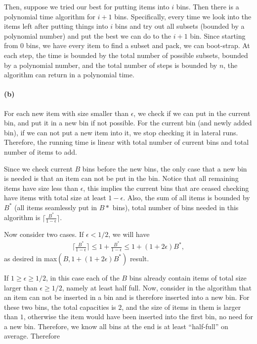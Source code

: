 \documentclass[12pt]{article}
\begin{document}
Then, suppose we tried our best for putting items into $i$ bins. Then there is a polynomial time algorithm for $i+1$ bins. Specifically, every time we look into the items left after putting things into $i$ bins and try out all subsets (bounded by a polynomial number) and put the best we can do to the $i+1$ bin. Since starting from $0$ bins, we have every item to find a subset and pack, we can boot-strap. At each step, the time is bounded by the total number of possible subsets, bounded by a polynomial number, and the total number of steps is bounded by $n$, the algorithm can return in a polynomial time.

\paragraph{(b)} For each new item with size smaller than $\epsilon$, we check if we can put in the current bin, and put it in a new bin if not possible. For the current bin (and newly added bin), if we can not put a new item into it, we stop checking it in lateral runs. Therefore, the running time is linear with total number of current bins and total number of items to add. 

Since we check current $B$ bins before the new bins, the only case that a new bin is needed is that an item can not be put in the bin. Notice that all remaining items have size less than $\epsilon$, this implies the current bins that are ceased checking have items with total size at least $1 - \epsilon$. Also, the sum of all items is bounded by $B^*$ (all items seamlessly put in $B*$ bins), total number of bins needed in this algorithm is $\lceil \frac{B^*}{1-\epsilon}\rceil$.

Now consider two cases. If $\epsilon < 1/2$, we will have 
\begin{align*}
\lceil \frac{B^*}{1-\epsilon}\rceil \leq 1 + \frac{B^*}{1-\epsilon} \leq 1 + (1 + 2\epsilon) B^*,
\end{align*}
as desired in max$(B, 1 + (1 + 2\epsilon) B^*)$ result.

If $1 \geq \epsilon \geq 1/2$, in this case each of the $B$ bins already contain items of total size larger than $\epsilon \geq 1/2$, namely at least half full. Now, consider in the algorithm that an item can not be inserted in a bin and is therefore inserted into a new bin. For these two bins, the total capacities is $2$, and the size of items in them is larger than $1$, otherwise the item would have been inserted into the first bin, no need for a new bin. Therefore, we know all bins at the end is at least ``half-full'' on average. Therefore 
\end{document}
